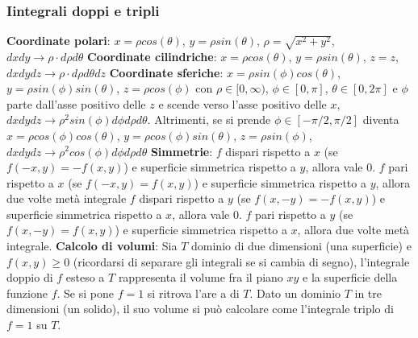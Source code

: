 \documentclass[fontsize=8pt]{scrartcl}
\begin{document}
\begin{multicols*}{4}
\subsubsection*{Iintegrali doppi e tripli}
\textbf{Coordinate polari}:\newline
$x = \rho cos(\theta)$, $y = \rho sin(\theta)$, $\rho = \sqrt{x^2 + y^2}$, $dxdy \rightarrow  \rho \cdot d \rho d \theta$\newline
\textbf{Coordinate cilindriche}:\newline
$x = \rho cos(\theta)$, $y = \rho sin(\theta)$, $z = z$, $dxdydz \rightarrow \rho \cdot d \rho d \theta dz$\newline
\textbf{Coordinate sferiche}:\newline
$x = \rho sin(\phi) cos(\theta)$, $y = \rho sin(\phi) sin(\theta)$, $z = \rho cos(\phi)$ con $\rho \in [0,\infty)$, $\phi \in[0,\pi]$, $\theta \in [0,2\pi]$ e $\phi$ parte dall'asse positivo delle $z$ e scende verso l'asse positivo delle $x$, $dxdydz \rightarrow \rho^2 sin(\phi) d \phi d \rho d \theta$. Altrimenti, se si prende $\phi \in [-\pi/2, \pi/2]$ diventa $x = \rho cos(\phi) cos( \theta)$, $y = \rho cos(\phi) sin(\theta)$, $z = \rho sin(\phi)$, $dxdydz \rightarrow \rho^2 cos(\phi) d \phi d \rho d \theta$\newline
\textbf{Simmetrie}:\newline
$f$ dispari rispetto a $x$ (se $f(-x,y) = -f(x,y)$) e superficie simmetrica rispetto a $y$, allora vale $0$.\newline
$f$ pari rispetto a $x$ (se $f(-x,y) = f(x,y)$) e superficie simmetrica rispetto a $y$, allora due volte metà integrale\newline
$f$ dispari rispetto a $y$ (se $f(x,-y) = -f(x,y)$) e superficie simmetrica rispetto a $x$, allora vale $0$.\newline
$f$ pari rispetto a $y$ (se $f(x,-y) = f(x,y)$) e superficie simmetrica rispetto a $x$, allora due volte metà integrale.\newline
\textbf{Calcolo di volumi}:\newline
Sia $T$ dominio di due dimensioni (una superficie) e $f(x,y) \geq 0$ (ricordarsi di separare gli integrali se si cambia di segno), l'integrale doppio di $f$ esteso a $T$ rappresenta il volume fra il piano $xy$ e la superficie della funzione $f$.\newline
Se si pone $f = 1$ si ritrova l'are a di $T$.\newline
Dato un dominio $T$ in tre dimensioni (un solido), il suo volume si può calcolare come l'integrale triplo di $f = 1$ su $T$.\newline

\end{multicols*}
\end{document}
